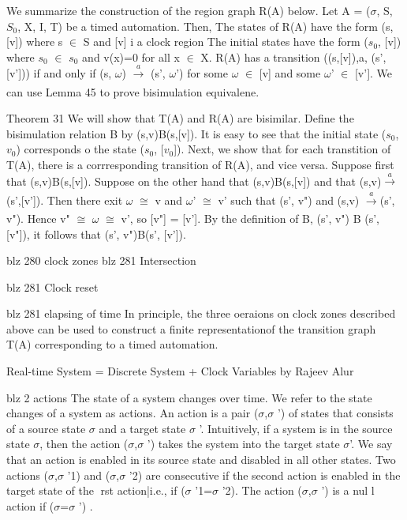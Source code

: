 We summarize the construction of the region graph R(A) below. Let A = ($\sigma$, S, $S_0$, X, I, T) be a timed automation. Then,
The states of R(A) have the form (s, [v]) where s $\in$ S and [v] i a clock region
The initial states have the form ($s_0$, [v]) where $s_0$ $\in$ $s_0$ and v(x)=0 for all x $\in$ X.
R(A) has a transition ((s,[v]),a, (s',[v'])) if and only if (s, $\omega$)  $\xrightarrow[]{a}$  (s', $\omega$') for some $\omega$ $\in$ [v] and some $\omega$' $\in$ [v'].
We can use Lemma 45 to prove bisimulation equivalene.

Theorem 31
We will show that T(A) and R(A) are bisimilar. Define the bisimulation relation B by (s,v)B(s,[v]). It is easy to see that the initial state ($s_0$, $v_0$) corresponds o the  state ($s_0$, [$v_0$]). Next, we show that for each transtition of T(A), there is a corrresponding transition  of R(A), and vice versa. Suppose first that (s,v)B(s,[v]). Suppose on the other hand that (s,v)B(s,[v]) and that  (s,v)$\xrightarrow[]{a}$(s',[v']). Then there exit $\omega$ $\cong$ v and $\omega$' $\cong$ v' such that (s', v") and (s,v) $\xrightarrow[]{a}$(s', v"). Hence v" $\cong$ $\omega$ $\cong$ v', so [v"] = [v']. By the definition of B, (s', v")
B (s', [v"]), it follows that (s', v")B(s', [v']).




blz 280 clock zones
blz 281 Intersection

blz 281 Clock reset


blz 281 elapsing of time
In principle, the three oeraions on clock zones described above can be used to construct a finite representationof the transition graph T(A) corresponding to a timed automation.


Real-time System = Discrete System + Clock Variables by Rajeev Alur

blz 2 actions
The state of a system changes over time. We refer to the state changes of a
system as actions. An action is a pair ($\sigma$,$\sigma$ ') of states that consists of a source
state $\sigma$ and a target state $\sigma$ '. Intuitively, if a system is in the source state $\sigma$,
then the action ($\sigma$,$\sigma$ ') takes the system into the target state $\sigma$'. We say that
an action is enabled in its source state and disabled in all other states. Two
actions ($\sigma$,$\sigma$ '1) and ($\sigma$,$\sigma$ '2) are consecutive if the second action is enabled in
the target state of the rst action|i.e., if ($\sigma$ '1=$\sigma$ '2). The action ($\sigma$,$\sigma$ ') is a nul l
action if ($\sigma$=$\sigma$ ')
.

